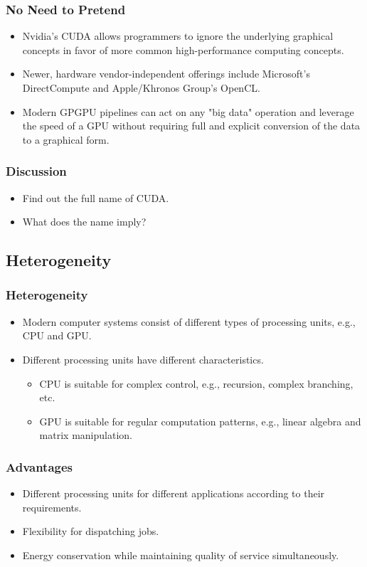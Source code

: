 \documentclass{beamer}
\begin{document}
\begin{frame}
  \frametitle{No Need to Pretend}
  \begin{itemize}
  \item Nvidia's CUDA allows programmers to ignore the underlying
    graphical concepts in favor of more common high-performance
    computing concepts.
  \item Newer, hardware vendor-independent offerings include Microsoft's
    DirectCompute and Apple/Khronos Group's OpenCL.
  \item Modern GPGPU pipelines can act on any "big data" operation and
    leverage the speed of a GPU without requiring full and explicit
    conversion of the data to a graphical form.
  \end{itemize}
\end{frame}

\begin{frame}
  \frametitle{Discussion}
  \begin{itemize}
  \item Find out the full name of CUDA.
  \item What does the name imply?
  \end{itemize}
\end{frame}

\subsection{Heterogeneity}

\begin{frame}
  \frametitle{Heterogeneity}
  \begin{itemize}
  \item Modern computer systems consist of different types of
    processing units, e.g., CPU and GPU.
  \item Different processing units have different characteristics.
    \begin{itemize}
    \item CPU is suitable for complex control, e.g., recursion,
      complex branching, etc.
    \item GPU is suitable for regular computation patterns, e.g.,
      linear algebra and matrix manipulation.
    \end{itemize}
  \end{itemize}
\end{frame}

\begin{frame}
  \frametitle{Advantages}
  \begin{itemize}
  \item Different processing units for different applications according
    to their requirements.
  \item Flexibility for dispatching jobs.
  \item Energy conservation while maintaining quality of service
    simultaneously.
  \end{itemize}
\end{frame}
\end{document}
